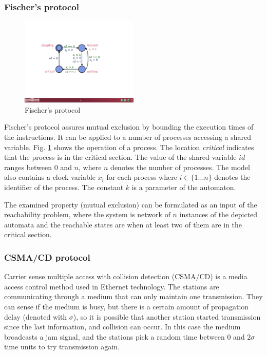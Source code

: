 \subsubsection{Fischer's protocol}

\begin{figure}
	\centering
	\includegraphics [width=0.5\textwidth]{include/figures/fischer_figure}%
	\caption{Fischer's protocol}
	\label{fig:fischer}
\end{figure}  

Fischer's protocol assures mutual exclusion by bounding the execution
times of the instructions. It can be applied to a number of processes accessing a
shared variable. Fig. \ref{fig:fischer}  shows the operation of a process.
The location \emph{critical} indicates that the process is in the critical
section. The value of the shared variable $id$ ranges between 0 and $n$,
where $n$ denotes the number of processes. The model also contains a 
clock variable $x_i$ for each process where $i \in \{1 \ldots n\}$ denotes the
identifier of the process. The constant $k$ is a parameter of the automaton.

The examined property (mutual exclusion) can be formulated as an input of the reachability problem, where the system is network of $n$ instances of the depicted automata and the reachable states are when at least two of them are in the critical section. 

\subsubsection{CSMA/CD protocol}

Carrier sense multiple access with collision detection (CSMA/CD) is a media access control method used in Ethernet technology. The stations are communicating through a medium that can only maintain one transmission. They can sense if the medium is busy, but there is a certain amount of propagation delay (denoted with $\sigma$), so it is possible that another station started transmission since the last information, and collision can occur. In this case the medium broadcasts a jam signal, and the stations pick a random time between 0 and $2\sigma$ time units to try transmission again.

